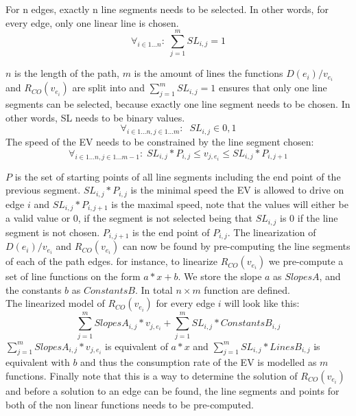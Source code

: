For n edges, exactly n line segments needs to be selected. In other words, for every edge, only one linear line is chosen. 
\begin{equation*}
\forall_{i\in1 \dots n }:\; \sum_{j=1}^{m} SL_{i,j} = 1
\end{equation*}

$n$ is the length of the path, $m$ is the amount of lines the functions \( D(e_i)/v_{e_i} \) and $R_{CO}(v_{e_i})$ are split into and $\sum_{j=1}^{m} SL_{i,j} = 1$ ensures that only one line segments can be selected, because exactly one line segment needs to be chosen. In other words, SL needs to be binary values.
\begin{equation*}
\forall_{i\in1 \dots n, j \in 1 \dots m}: \; \; SL_{i,j} \in{0,1} 
\end{equation*}
The speed of the EV needs to be constrained by the line segment chosen:
\begin{equation*}
\forall_{i\in1 \dots n, j \in 1 \dots m-1}:\; SL_{i,j} * P_{i,j}  \le  v_{j,e_i} \le SL_{i,j}*P_{i,j+1}
\end{equation*}

$P$ is the set of starting points of all line segments including the end point of the previous segment. $SL_{i,j} * P_{i,j}$ is the minimal speed the EV is allowed to drive on edge $i$ and $SL_{i,j}*P_{i,j+1}$ is the maximal speed, note that the values will either be a valid value or $0$, if the segment is not selected being that $SL_{i,j}$ is $0$ if the line segment is not chosen. $P_{i,j+1}$ is the end point of $P_{i,j}$. 
The linearization of \( D(e_i)/v_{e_i} \) and $R_{CO}(v_{e_i})$ can now be found by pre-computing the line segments of each of the path edges. for instance, to linearize $R_{CO}(v_{e_i})$ we pre-compute a set of line functions on the form $a*x+b$. We store the slope $a$ as $SlopesA$, and the constants $b$ as $ConstantsB$. In total $n \times m$ function are defined. \\
The linearized model of $R_{CO}(v_{e_i})$ for every edge $i$ will look like this:
\begin{equation*}
\sum_{j=1}^{m} SlopesA_{i,j}*v_{j,e_i} + \sum_{j=1}^{m} SL_{i,j}*ConstantsB_{i,j} 
\end{equation*}
$\sum_{j=1}^{m} SlopesA_{i,j}*v_{j,e_i}$ is equivalent of $a*x$ and $\sum_{j=1}^{m} SL_{i,j}*LinesB_{i,j}$ is equivalent with $b$ and thus the consumption rate of the EV is modelled as $m$ functions. 
Finally note that this is a way to determine the solution of $R_{CO}(v_{e_i})$ and before a solution to an edge can be found, the line segments and points for both of the non linear functions needs to be pre-computed. 


